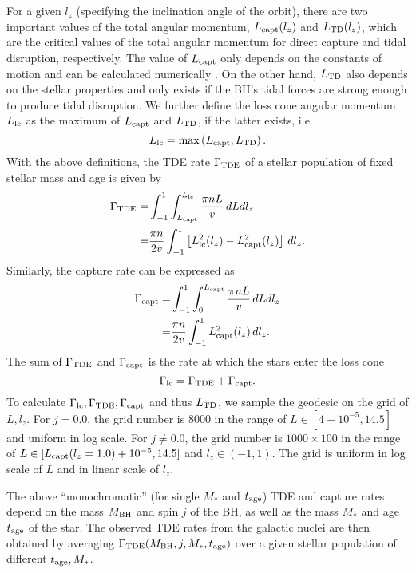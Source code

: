 \documentclass[useAMS,usenatbib]{mn2e}
\def\mstar{M_*}
\def\mBH{M_{\rm BH}}
\def\Lcapt{L_{\rm capt}}
\def\LTD{L_{\rm TD}}
\def\Llc{L_{\rm lc}}
\def\GammaTDE{\Gamma_{\rm TDE}}
\def\Gammacapt{\Gamma_{\rm capt}}
\def\Gammalc{\Gamma_{\rm lc}}
\def\tage{t_{\rm age}}
\newcommand{\lrb}[1]{\left({#1}\right)}
\newcommand{\lrsb}[1]{\left[{#1}\right]}
\begin{document}
For a given $l_z$ (specifying the inclination angle of the orbit), there are two important values of the total angular momentum, $\Lcapt(l_z)$ and $\LTD(l_z)$, which are the critical values of the total angular momentum for direct capture and tidal disruption, respectively. The value of $\Lcapt$ only depends on the constants of motion and can be calculated numerically \citep[see also][]{Coughlin2022a}. On the other hand, $\LTD$ also depends on the stellar properties and only exists if the BH's tidal forces are strong enough to produce tidal disruption.
We further define the loss cone angular momentum $\Llc$ as the maximum of $\Lcapt$ and $\LTD$, if the latter exists, i.e.
\begin{equation*}
    \Llc =\max\lrb{\Lcapt, \LTD}.
\end{equation*}
With the above definitions, the TDE rate $\GammaTDE$ of a stellar population of fixed stellar mass and age is given by
\begin{align}
    \GammaTDE = & \int_{-1}^1\int_{\Lcapt}^{\Llc}\frac{\pi nL}{v}\,dLdl_z\nonumber\\
               = & \frac{\pi n}{2v}\int_{-1}^1 \lrsb{\Llc^2(l_z)-\Lcapt^2(l_z)}\,dl_z.
\end{align}
Similarly, the capture rate can be expressed as
\begin{align}
    \Gammacapt = & \int_{-1}^1\int_0^{\Lcapt}\frac{\pi nL}{v}\,dLdl_z\nonumber\\
               = & \frac{\pi n}{2v}\int_{-1}^1 \Lcapt^2(l_z)\,dl_z.
\end{align}
The sum of $\GammaTDE$ and $\Gammacapt$ is the rate at which the stars enter the loss cone
\begin{equation}
    \Gammalc = \GammaTDE + \Gammacapt.
\end{equation}
To calculate $\Gammalc,\GammaTDE,\Gammacapt$ and thus $\LTD$, we sample the geodesic on the grid of $L,l_z$. 
For $j=0.0$, the grid number is 8000 in the range of $L\in[4+10^{-5},14.5]$ and uniform in log scale.
For $j\ne 0.0$, the grid number is $1000\times100$ in the range of $L\in[\Lcapt(l_z=1.0)+10^{-5},14.5]$ and $l_z\in(-1,1)$. The grid is uniform in log scale of $L$ and in linear scale of $l_z$.

The above ``monochromatic'' (for single $\mstar$ and $\tage$) TDE and capture rates depend on the mass $\mBH$ and spin $j$ of the BH, as well as the mass $\mstar$ and age $\tage$ of the star.
The observed TDE rates from the galactic nuclei are then obtained by averaging $\GammaTDE(\mBH,j,\mstar,\tage)$ over a given stellar population of different $\tage,\mstar$.
\end{document}
